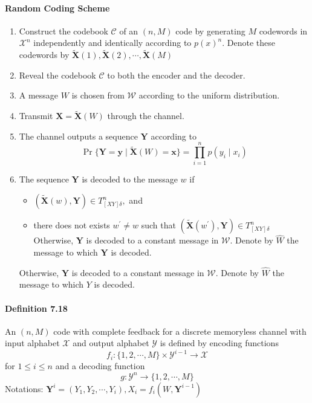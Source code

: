 \documentclass[8pt]{article}
\begin{document}
\paragraph{Random Coding Scheme}
\begin{enumerate}
	\item Construct the codebook $\mathcal{C}$ of an $(n, M)$ code by generating $M$ codewords in $\mathcal{X}^{n}$ independently and identically according to $p(x)^{n} .$ Denote these codewords by $\tilde{\mathbf{X}}(1), \tilde{\mathbf{X}}(2), \cdots, \tilde{\mathbf{X}}(M)$
	\item Reveal the codebook $\mathcal{C}$ to both the encoder and the decoder.
	\item A message $W$ is chosen from $\mathcal{W}$ according to the uniform distribution.
	\item Transmit $\mathbf{X}=\tilde{\mathbf{X}}(W)$ through the channel.
	\item The channel outputs a sequence $\mathbf{Y}$ according to
	$$
	\operatorname{Pr}\{\mathbf{Y}=\mathbf{y} \mid \tilde{\mathbf{X}}(W)=\mathbf{x}\}=\prod_{i=1}^{n} p\left(y_{i} \mid x_{i}\right)
	$$
	\item The sequence $\mathbf{Y}$ is decoded to the message $w$ if
	\begin{itemize}
		\item $(\tilde{\mathbf{X}}(w), \mathbf{Y}) \in T_{[X Y] \delta}^{n},$ and
		\item there does not exists $w^{\prime} \neq w$ such that $\left(\tilde{\mathbf{X}}\left(w^{\prime}\right), \mathbf{Y}\right) \in T_{[X Y] \delta}^{n}$
		Otherwise, $\mathbf{Y}$ is decoded to a constant message in $\mathcal{W}$. Denote by $\hat{W}$ the message to which $\mathbf{Y}$ is decoded.
	\end{itemize}
	Otherwise, $\mathbf{Y}$ is decoded to a constant message in $\mathcal{W}$. Denote by $\hat{W}$ the message to which $Y$ is decoded.
\end{enumerate}

\paragraph{Definition 7.18} An $(n, M)$ code with complete feedback for a discrete memoryless channel with input alphabet $\mathcal{X}$ and output alphabet $\mathcal{Y}$ is defined by encoding functions
$$
f_{i}:\{1,2, \cdots, M\} \times \mathcal{Y}^{i-1} \rightarrow \mathcal{X}
$$
for $1 \leq i \leq n$ and a decoding function
$$
g: \mathcal{Y}^{n} \rightarrow\{1,2, \cdots, M\}
$$
Notations: $\mathbf{Y}^{i}=\left(Y_{1}, Y_{2}, \cdots, Y_{i}\right), X_{i}=f_{i}\left(W, \mathbf{Y}^{i-1}\right)$
\end{document}
